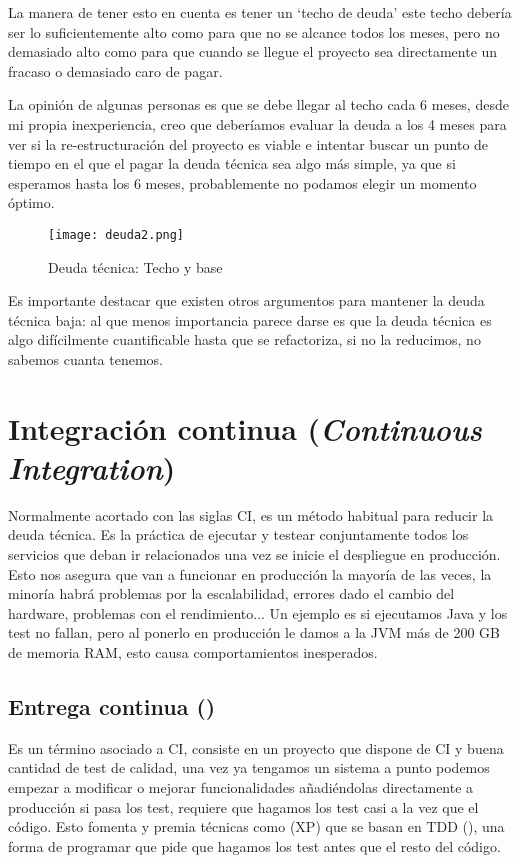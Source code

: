 La manera de tener esto en cuenta es tener un `techo de deuda' este techo debería ser lo suficientemente alto como para que no se alcance todos los meses, pero no demasiado alto como para que cuando se llegue el proyecto sea directamente un fracaso o demasiado caro de pagar.

La opinión de algunas personas es que se debe llegar al techo cada 6 meses, desde mi propia inexperiencia, creo que deberíamos evaluar la deuda a los 4 meses para ver si la re-estructuración del proyecto es viable e intentar buscar un punto de tiempo en el que el pagar la deuda técnica sea algo más simple, ya que si esperamos hasta los 6 meses, probablemente no podamos elegir un momento óptimo. 

\begin{figure}
	\centering
	\texttt{[image: deuda2.png]}
	\caption{Deuda técnica: Techo y base \cite{kni13}}\label{fig:deuda2.png}
\end{figure}

Es importante destacar que existen otros argumentos para mantener la deuda técnica baja: al que menos importancia parece darse es que la deuda técnica es algo difícilmente cuantificable hasta que se refactoriza, si no la reducimos, no sabemos cuanta tenemos.

\section{Integración continua (\textit{Continuous Integration})}

Normalmente acortado con las siglas CI, es un método habitual para reducir la deuda técnica. Es la práctica de ejecutar y testear conjuntamente todos los servicios que deban ir relacionados una vez se inicie el despliegue en producción. Esto nos asegura que van a funcionar en producción la mayoría de las veces, la minoría habrá problemas por la escalabilidad, errores dado el cambio del hardware, problemas con el rendimiento... Un ejemplo es si ejecutamos Java y los test no fallan, pero al ponerlo en producción le damos a la JVM más de 200 GB de memoria RAM, esto causa comportamientos inesperados.

\subsection{Entrega continua ()}

Es un término asociado a CI, consiste en un proyecto que dispone de CI y buena cantidad de test de calidad, una vez ya tengamos un sistema a punto podemos empezar a modificar o mejorar funcionalidades añadiéndolas directamente a producción si pasa los test, requiere que hagamos los test casi a la vez que el código. Esto fomenta y premia técnicas como  (XP) que se basan en TDD (), una forma de programar que pide que hagamos los test antes que el resto del código.


